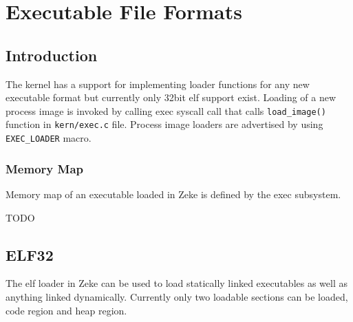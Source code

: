 \part{Executable File Formats}

\chapter{Introduction}

The kernel has a support for implementing loader functions for any new
executable format but currently only 32bit \acf{elf} support exist. 
Loading of a new process image is invoked by calling exec syscall call that
calls \verb+load_image()+ function in \verb+kern/exec.c+ file.
Process image loaders are advertised by using \verb+EXEC_LOADER+ macro.

\section{Memory Map}

Memory map of an executable loaded in Zeke is defined by the exec subsystem.

TODO

\chapter{ELF32}

The \acs{elf} loader in Zeke can be used to load statically linked executables
as well as anything linked dynamically. Currently only two loadable sections can
be loaded, code region and heap region.
